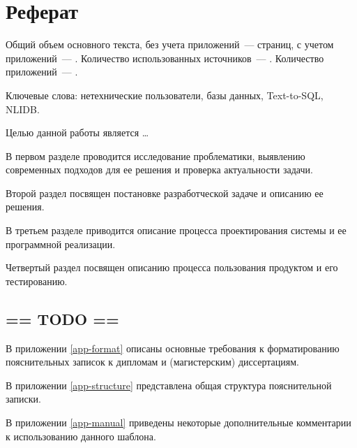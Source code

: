 \chapter*{Реферат}
\thispagestyle{plain}

Общий объем основного текста, без учета приложений~---
\pageref{end_of_main_text} страниц, с учетом приложений~---
\pageref{end_of_document}. Количество использованных источников~---
\hyperref[sec:bibliography]{}. Количество приложений~--- 
\hyperref[sec:appendices]{}.
 
Ключевые слова: нетехнические пользователи, базы данных, Text-to-SQL, NLIDB.

Целью данной работы является \dots

В первом разделе проводится исследование проблематики, выявлению современных подходов для ее решения и 
проверка актуальности задачи.

Второй раздел посвящен постановке разработческой задаче и описанию ее решения.

В третьем разделе приводится описание процесса проектирования системы и ее программной реализации.

Четвертый раздел посвящен описанию процесса пользования продуктом и его тестированию.

\section{== TODO ==}

В приложении \ref{app-format} описаны основные требования к форматированию пояснительных записок к дипломам и (магистерским) диссертациям.

В приложении \ref{app-structure} представлена общая структура пояснительной записки.

В приложении \ref{app-manual} приведены некоторые дополнительные комментарии к использованию данного шаблона.
